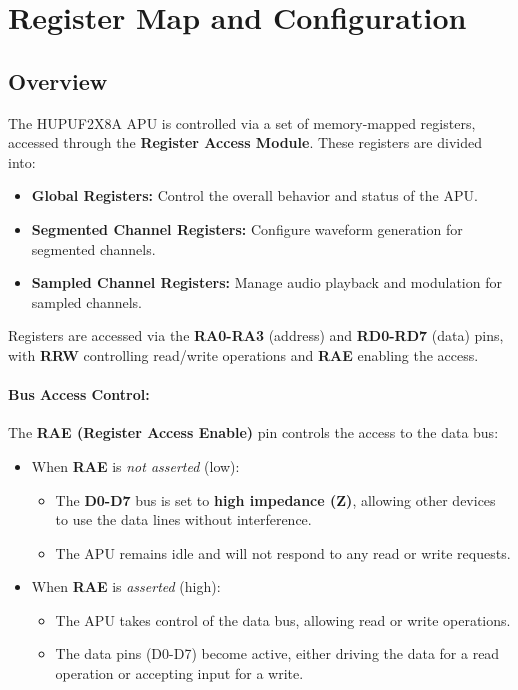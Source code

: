 \section{Register Map and Configuration}

\subsection{Overview}
The HUPUF2X8A APU is controlled via a set of memory-mapped registers, accessed through the \textbf{Register Access Module}. These registers are divided into:
\begin{itemize}
    \item \textbf{Global Registers:} Control the overall behavior and status of the APU.
    \item \textbf{Segmented Channel Registers:} Configure waveform generation for segmented channels.
    \item \textbf{Sampled Channel Registers:} Manage audio playback and modulation for sampled channels.
\end{itemize}

Registers are accessed via the \textbf{RA0-RA3} (address) and \textbf{RD0-RD7} (data) pins, with \textbf{RRW} controlling read/write operations and \textbf{RAE} enabling the access.

\paragraph{Bus Access Control:}
The \textbf{RAE (Register Access Enable)} pin controls the access to the data bus:
\begin{itemize}
    \item When \textbf{RAE} is \emph{not asserted} (low):
    \begin{itemize}
        \item The \textbf{D0-D7} bus is set to \textbf{high impedance (Z)}, allowing other devices to use the data lines without interference.
        \item The APU remains idle and will not respond to any read or write requests.
    \end{itemize}
    \item When \textbf{RAE} is \emph{asserted} (high):
    \begin{itemize}
        \item The APU takes control of the data bus, allowing read or write operations.
        \item The data pins (D0-D7) become active, either driving the data for a read operation or accepting input for a write.
    \end{itemize}
\end{itemize}

